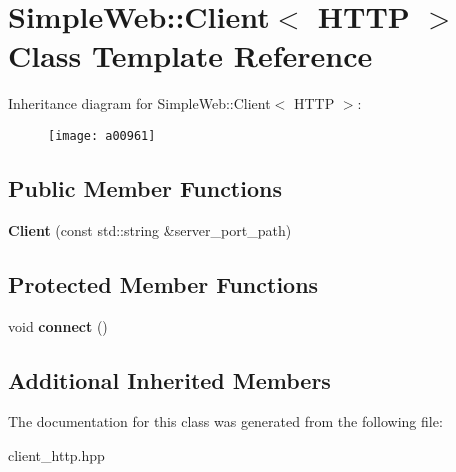 \hypertarget{a00961}{}\section{Simple\+Web\+:\+:Client$<$ H\+T\+TP $>$ Class Template Reference}
\label{a00961}
Inheritance diagram for Simple\+Web\+:\+:Client$<$ H\+T\+TP $>$\+:\begin{figure}[H]
\begin{center}
\leavevmode
\texttt{[image: a00961]}
\end{center}
\end{figure}
\subsection*{Public Member Functions}
\begin{DoxyCompactItemize}
\item 
\mbox{\label{a00961_a47655afc849e459096743876391dae17}} 
{\bfseries Client} (const std\+::string \&server\+\_\+port\+\_\+path)
\end{DoxyCompactItemize}
\subsection*{Protected Member Functions}
\begin{DoxyCompactItemize}
\item 
\mbox{\label{a00961_aebed110274c94b539e2d0a857c24991d}} 
void {\bfseries connect} ()
\end{DoxyCompactItemize}
\subsection*{Additional Inherited Members}


The documentation for this class was generated from the following file\+:\begin{DoxyCompactItemize}
\item 
client\+\_\+http.\+hpp\end{DoxyCompactItemize}
